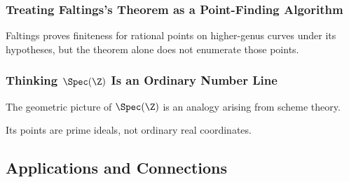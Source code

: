 \subsubsection{Treating Faltings's Theorem as a Point-Finding Algorithm}

Faltings proves finiteness for rational points on higher-genus curves under
its hypotheses, but the theorem alone does not enumerate those points.

\subsubsection{Thinking \(\Spec(\Z)\) Is an Ordinary Number Line}

The geometric picture of \(\Spec(\Z)\) is an analogy arising from scheme
theory.

Its points are prime ideals, not ordinary real coordinates.

\subsection{Applications and Connections}
\label{subsec:arithmetic-geometry-applications}

